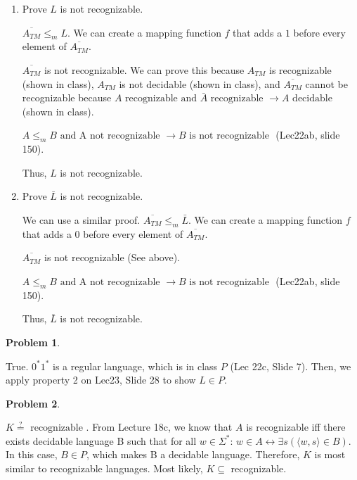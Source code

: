\documentclass[11pt]{article}
\theoremstyle{definition}
\theoremstyle{case}
\theoremstyle{theorem}
\newtheorem{prob}{Problem}
\begin{document}
\begin{enumerate}[label=(\arabic*)]

\item

Prove $L$ is not recognizable.

$\overline{A_{TM}} \leq_m L$. We can create a mapping function $f$ that adds a $1$ before every element of $\overline{A_{TM}}$.

$\overline{A_{TM}}$ is not recognizable. We can prove this because $A_{TM}$ is recognizable (shown in class), 
$A_{TM}$ is not decidable (shown in class), and $\overline{A_{TM}}$ cannot be recognizable because 
$A \text{ recognizable and } \bar{A} \text{ recognizable } \rightarrow A \text{ decidable }$ (shown in class). 

$A \leq_m B \text{ and A not recognizable } \rightarrow B \text{ is not recognizable }$ (Lec22ab, slide 150).

Thus, $L$ is not recognizable.

\item

Prove $\bar{L}$ is not recognizable.

We can use a similar proof. $\overline{A_{TM}} \leq_m \bar{L}$. We can create a mapping function $f$ that adds a $0$ before every element of $\overline{A_{TM}}$.

$\overline{A_{TM}}$ is not recognizable (See above).

$A \leq_m B \text{ and A not recognizable } \rightarrow B \text{ is not recognizable }$ (Lec22ab, slide 150).

Thus, $\bar{L}$ is not recognizable.

\end{enumerate}

\newpage

\begin{prob}\end{prob}

True. $0^*1^*$ is a regular language, which is in class $P$ (Lec 22c, Slide 7). Then, we
apply property 2 on Lec23, Slide 28 to show $L \in P$.

\begin{prob}\end{prob}

$K \stackrel{?}{=} \text{ recognizable }$. From Lecture 18c, we know that 
$A$ is recognizable iff there exists decidable language B such that for all $w \in \Sigma^*$:
$w \in A \leftrightarrow \exists s ( \langle w, s \rangle \in B)$. In this case, $B \in P$, which
makes B a decidable language. Therefore, $K$ is most similar to recognizable languages. Most likely,
$K \subseteq $ recognizable. 
\end{document}

